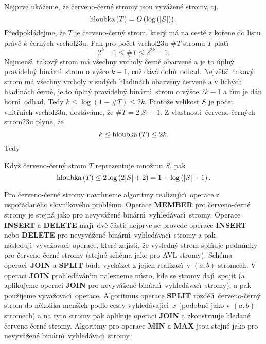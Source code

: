 \flushpar Nejprve uk\'a\v zeme, \v ze \v cerveno-\v cern\'e stromy jsou 
vyv\'a\v zen\'e stro\-my, tj. $$\operatorname{hloubka}\left(T\right)=O\left(\log\left(|S|\right)\right).$$
P\v redpokl\'adejme, \v ze $T$ je \v cerveno-\v cern\'y strom, kter\'y m\'a 
na cest\v e z ko\v rene do listu pr\'av\v e $k$ \v cern\'ych 
vrchol\accent23u. Pak pro po\v cet vrchol\accent23u $\#T$ 
stromu $T$ plat\'\i\ 
$$2^k-1\le \#T\le 2^{2k}-1.$$
Nejmen\v s\'\i\ takov\'y strom m\'a v\v sechny vrcholy \v cern\v e 
obarven\'e a je to \'upln\'y pravideln\'y bin\'arn\'\i\ strom o 
v\'y\v sce $k-1$, co\v z d\'av\'a doln\'\i\ odhad.  Nejv\v et\v s\'\i\ takov\'y 
strom m\'a v\v sechny vrcholy v sud\'ych hladin\'ach obarveny 
\v cerven\v e a v lich\'ych hladin\'ach \v cern\v e, je to \'upln\'y 
pravideln\'y bin\'arn\'\i\ strom o v\'y\v sce $2k-1$ a t\'\i m je d\'an 
horn\'\i\ odhad. Tedy $k\le\log\left(1+\#T\right)\le 2k$.
Proto\v ze velikost $S$ je po\v cet vnit\v rn\'\i ch vrchol\accent23u, 
dost\'av\'ame, \v ze $\#T=2|S|+1$. Z vlastnost\'\i\ \v cerveno-\v cern\'ych 
strom\accent23u plyne, \v ze 
$$k\le\operatorname{hloubka}\left(T\right)\le 2k.$$
Tedy
\medskip

Kdy\v z \v cerveno-\v cern\'y strom $T$ 
reprezentuje mno\v zinu $S$, pak $$\operatorname{hloubka}\left(T\right)\le 2\log\left(2|S|+2\right)=1+\log\left(|S|+1\right).$$
\endproclaim

\flushpar Pro \v cerveno-\v cern\'e stromy navrhneme algoritmy 
realizuj\'\i c\'\i\ ope\-race z uspo\v r\'adan\'eho slovn\'\i\-ko\-v\'eho probl\'emu.  
Operace {\bf MEMBER} pro \v cerveno-\v cern\'e stromy je stejn\'a jako pro 
nevyv\'a\v zen\'e bin\'arn\'\i\ vyhled\'avac\'\i\ stromy. Operace 
{\bf IN\-SERT} a {\bf DELETE} maj\'\i\ dv\v e \v c\'asti:  nejprve se provede 
ope\-race {\bf INSERT} nebo {\bf DELETE} pro nevyv\'a\v zen\'e bin\'arn\'\i\ 
vy\-hled\'avac\'\i\ stromy a pak n\'asleduj\'\i\ vyva\v zovac\'\i\ operace, kter\'e 
zajist\'\i , \v ze v\'ysledn\'y strom spl\v nuje pod\-m\'\i n\-ky pro \v cerveno-\v cern\'e 
stromy (stejn\'e sch\'ema jako pro AVL-stromy). Sch\'ema operac\'\i\ 
{\bf JOIN} a {\bf SPLIT} bude vych\'azet z jejich realizac\'\i\ v $
\left(a,b\right)$-stromech. 
V operaci {\bf JOIN} prohled\'av\'an\'\i m nalezneme m\'\i sto, kde se 
stromy  
daj\'\i\ spojit (a aplikujeme operaci {\bf JOIN} pro 
nevyv\'a\v zen\'e 
bin\'arn\'\i\ vyhled\'a\-va\-c\'\i\ stromy), a pak pou\v zijeme 
vyva\v zovac\'\i\ operace. Algoritmus ope\-race {\bf SPLIT} rozd\v el\'\i\ \v cerveno-\v cern\'y strom 
do n\v ekolika men\v s\'\i ch podle cesty vyhled\'avaj\'\i c\'\i\ $
x$ (podobn\v e jako 
v $\left(a,b\right)$-stromech) a na tyto stromy pak aplikuje operaci {\bf JOIN }
a zkonstruuje hledan\'e \v cerveno-\v cern\'e stromy. Algoritmy pro 
ope\-race {\bf MIN} a {\bf MAX} jsou stejn\'e jako pro nevyv\'a\v zen\'e bin\'arn\'\i\ 
vyhled\'avac\'\i\ stromy.
\medskip

